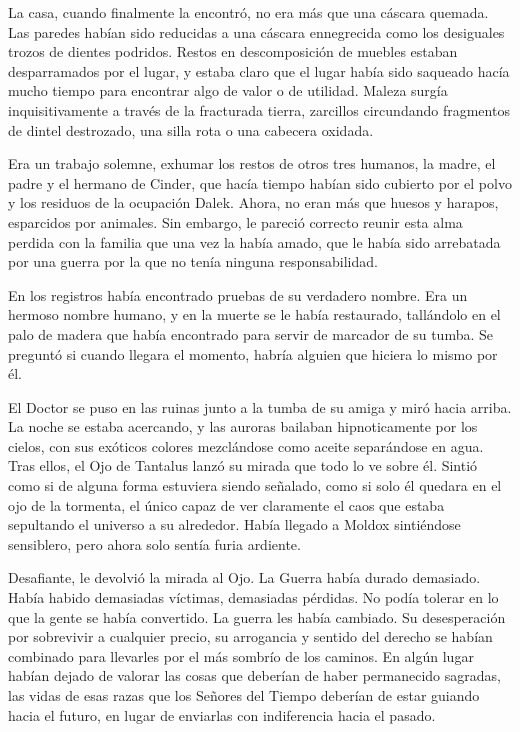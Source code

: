 La casa, cuando finalmente la encontró, no era más que una cáscara quemada. Las paredes habían sido reducidas a una cáscara ennegrecida como los desiguales trozos de dientes podridos. Restos en descomposición de muebles estaban desparramados por el lugar, y estaba claro que el lugar había sido saqueado hacía mucho tiempo para encontrar algo de valor o de utilidad. Maleza surgía inquisitivamente a través de la fracturada tierra, zarcillos circundando fragmentos de dintel destrozado, una silla rota o una cabecera oxidada.

Era un trabajo solemne, exhumar los restos de otros tres humanos, la madre, el padre y el hermano de Cinder, que hacía tiempo habían sido cubierto por el polvo y los residuos de la ocupación Dalek. Ahora, no eran más que huesos y harapos, esparcidos por animales. Sin embargo, le pareció correcto reunir esta alma perdida con la familia que una vez la había amado, que le había sido arrebatada por una guerra por la que no tenía ninguna responsabilidad.

En los registros había encontrado pruebas de su verdadero nombre. Era un hermoso nombre humano, y en la muerte se le había restaurado, tallándolo en el palo de madera que había encontrado para servir de marcador de su tumba. Se preguntó si cuando llegara el momento, habría alguien que hiciera lo mismo por él.

El Doctor se puso en las ruinas junto a la tumba de su amiga y miró hacia arriba. La noche se estaba acercando, y las auroras bailaban hipnoticamente por los cielos, con sus exóticos colores mezclándose como aceite separándose en agua. Tras ellos, el Ojo de Tantalus lanzó su mirada que todo lo ve sobre él. Sintió como si de alguna forma estuviera siendo señalado, como si solo él quedara en el ojo de la tormenta, el único capaz de ver claramente el caos que estaba sepultando el universo a su alrededor. Había llegado a Moldox sintiéndose sensiblero, pero ahora solo sentía furia ardiente.

Desafiante, le devolvió la mirada al Ojo. La Guerra había durado demasiado. Había habido demasiadas víctimas, demasiadas pérdidas. No podía tolerar en lo que la gente se había convertido. La guerra les había cambiado. Su desesperación por sobrevivir a cualquier precio, su arrogancia y sentido del derecho se habían combinado para llevarles por el más sombrío de los caminos. En algún lugar habían dejado de valorar las cosas que deberían de haber permanecido sagradas, las vidas de esas razas que los Señores del Tiempo deberían de estar guiando hacia el futuro, en lugar de enviarlas con indiferencia hacia el pasado.

